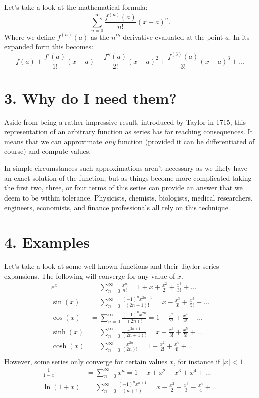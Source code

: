\documentclass[11pt]{article}
\begin{document}
Let's take a look at the mathematical formula:
\begin{equation}
    \sum_{n=0}^{\infty} \frac{f^{(n)}(a)}{n!} (x-a)^n.
\end{equation}
Where we define $f^{(n)}(a)$ as the $n^{th}$ derivative evaluated at the point $a$. In its expanded form this becomes:
\begin{equation}
    f(a) + \frac{f'(a)}{1!} (x-a) + \frac{f''(a)}{2!} (x-a)^2 + \frac{f^{(3)}(a)}{3!} (x-a)^3 + \ldots
\end{equation}

\section*{3. Why do I need them?}
Aside from being a rather impressive result, introduced by Taylor in 1715, this representation of an arbitrary function as series has far reaching consequences. It means that we can approximate \textit{any} function (provided it can be differentiated of course) and compute values.

In simple circumstances such approximations aren't necessary as we likely have an exact solution of the function, but as things become more complicated taking the first two, three, or four terms of this series can provide an answer that we deem to be within tolerance. Physicists, chemists, biologists, medical researchers, engineers, economists, and finance professionals all rely on this technique.

\section*{4. Examples}
Let's take a look at some well-known functions and their Taylor series expansions. The following will converge for any value of $x$.
\begin{align}
    e^x &= \sum_{n=0}^{\infty} \frac{x^n}{n!} = 1 + x + \frac{x^2}{2!} + \frac{x^3}{3!} + \ldots \\
    \sin (x) &= \sum_{n=0}^{\infty} \frac{(-1)^n x^{2n+1}}{(2n+1)!} = x - \frac{x^3}{3!} + \frac{x^5}{5!} - \ldots \\
    \cos (x) &= \sum_{n=0}^{\infty} \frac{(-1)^n x^{2n}}{(2n)!} = 1 - \frac{x^2}{2!} + \frac{x^4}{4!} - \ldots \\
    \sinh (x) &= \sum_{n=0}^{\infty} \frac{x^{2n+1}}{(2n+1)!} = x + \frac{x^3}{3!} + \frac{x^5}{5!} + \ldots \\
    \cosh (x) &= \sum_{n=0}^{\infty} \frac{x^{2n}}{(2n)!} = 1 + \frac{x^2}{2!} + \frac{x^4}{4!} + \ldots \\
\end{align}
However, some series only converge for certain values $x$, for instance if $|x| < 1$.
\begin{align}
    \frac{1}{1-x} &= \sum_{n=0}^{\infty} x^n = 1 + x + x^2 + x^3 + x^4 + \ldots \\
    \ln (1+x) &= \sum_{n=0}^{\infty} \frac{(-1)^n x^{n+1}}{(n+1)} = x - \frac{x^2}{2} + \frac{x^3}{3} - \frac{x^4}{4} + \ldots 
\end{align}
\end{document}
